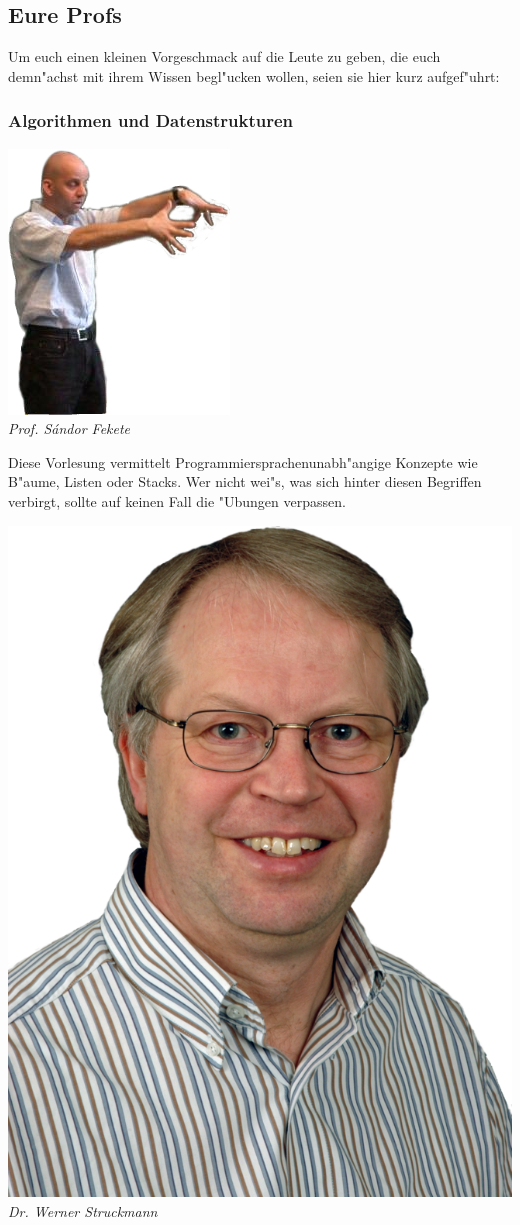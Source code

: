 \subsection{Eure Profs}
Um euch einen kleinen Vorgeschmack auf die Leute zu geben, die euch demn"achst mit ihrem Wissen begl"ucken wollen, seien sie hier kurz aufgef"uhrt:
\subsubsection{Algorithmen und Datenstrukturen}


\includegraphics[width=0.7\linewidth]{bilder/dozenten/fekete_frei.png}\\
\textit{Prof. S\'andor Fekete}

Diese Vorlesung vermittelt Programmiersprachenunabh"angige Konzepte wie B"aume, Listen oder Stacks. Wer nicht wei"s, was sich hinter diesen Begriffen verbirgt, sollte auf keinen Fall die "Ubungen verpassen.

\includegraphics[width=0.6\linewidth]{bilder/dozenten/struck.png}\\
\textit{Dr. Werner Struckmann}

